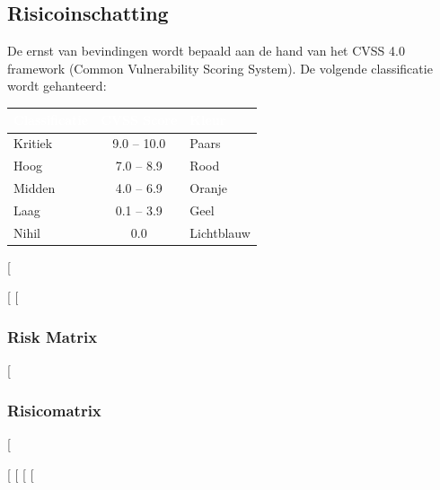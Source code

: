 {{{{\subsection{Risicoinschatting}

De ernst van bevindingen wordt bepaald aan de hand van het CVSS 4.0 framework
(Common Vulnerability Scoring System). De volgende classificatie wordt gehanteerd:

\begin{center}
\begin{tabular}{|l|c|l|}
  \hline
  \rowcolor{rijkblauw}\textcolor{white}{\textbf{Classificatie}} & \textcolor{white}{\textbf{CVSS Score}} & \textcolor{white}{\textbf{Kleur}} \\
  \hline
  Kritiek & 9.0 -- 10.0 & \textcolor{opaars}{Paars} \\
  Hoog & 7.0 -- 8.9 & \textcolor{ored}{Rood} \\
  Midden & 4.0 -- 6.9 & \textcolor{oorange}{Oranje} \\
  Laag & 0.1 -- 3.9 & \textcolor{oyellow}{Geel} \\
  Nihil & 0.0 & \textcolor{olichtblauw}{Lichtblauw} \\
  \hline
\end{tabular}
\end{center}
[%

[%
[%
\subsubsection*{Risk Matrix}
[%
\subsubsection*{Risicomatrix}
[%

\begin{center}
\end{center}
[%
[%
[%
[%
}}}}
